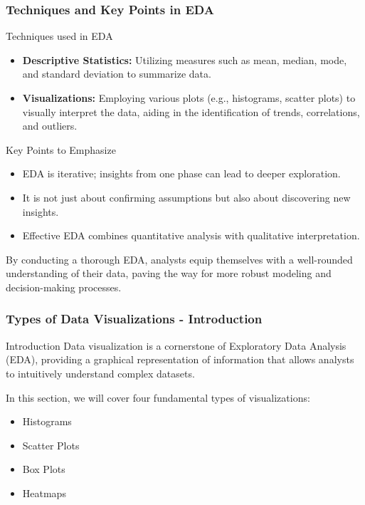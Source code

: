 \documentclass[aspectratio=169]{beamer}
\begin{document}
\begin{frame}[fragile]
    \frametitle{Techniques and Key Points in EDA}
    \begin{block}{Techniques used in EDA}
        \begin{itemize}
            \item \textbf{Descriptive Statistics:} Utilizing measures such as mean, median, mode, and standard deviation to summarize data.
            \item \textbf{Visualizations:} Employing various plots (e.g., histograms, scatter plots) to visually interpret the data, aiding in the identification of trends, correlations, and outliers.
        \end{itemize}
    \end{block}
    
    \begin{block}{Key Points to Emphasize}
        \begin{itemize}
            \item EDA is iterative; insights from one phase can lead to deeper exploration.
            \item It is not just about confirming assumptions but also about discovering new insights.
            \item Effective EDA combines quantitative analysis with qualitative interpretation.
        \end{itemize}
    \end{block}
    
    By conducting a thorough EDA, analysts equip themselves with a well-rounded understanding of their data, paving the way for more robust modeling and decision-making processes.
\end{frame}

\begin{frame}[fragile]
    \frametitle{Types of Data Visualizations - Introduction}
    \begin{block}{Introduction}
        Data visualization is a cornerstone of Exploratory Data Analysis (EDA), providing a graphical representation of information that allows analysts to intuitively understand complex datasets. 
    \end{block}
    In this section, we will cover four fundamental types of visualizations:
    \begin{itemize}
        \item Histograms
        \item Scatter Plots
        \item Box Plots
        \item Heatmaps
    \end{itemize}
\end{frame}
\end{document}
